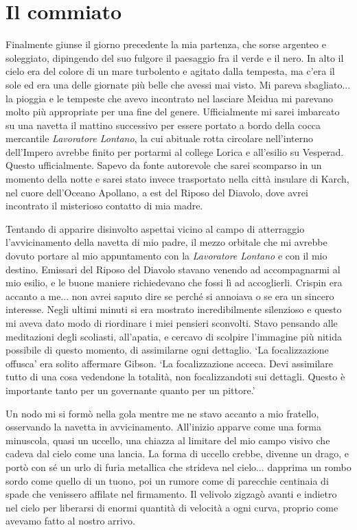 \chapter{Il commiato}

Finalmente giunse il giorno precedente la mia partenza, che sorse
argenteo e soleggiato, dipingendo del suo fulgore il paesaggio fra il
verde e il nero. In alto il cielo era del colore di un mare turbolento e
agitato dalla tempesta, ma c'era il sole ed era una delle giornate più
belle che avessi mai visto. Mi pareva sbagliato... la pioggia e le
tempeste che avevo incontrato nel lasciare Meidua mi parevano molto più
appropriate per una fine del genere. Ufficialmente mi sarei imbarcato su
una navetta il mattino successivo per essere portato a bordo della cocca
mercantile \emph{Lavoratore Lontano}, la cui abituale rotta circolare
nell'interno dell'Impero avrebbe finito per portarmi al college Lorica e
all'esilio su Vesperad. Questo ufficialmente. Sapevo da fonte autorevole
che sarei scomparso in un momento della notte e sarei stato invece
trasportato nella città insulare di Karch, nel cuore dell'Oceano
Apollano, a est del Riposo del Diavolo, dove avrei incontrato il
misterioso contatto di mia madre.

Tentando di apparire disinvolto aspettai vicino al campo di atterraggio
l'avvicinamento della navetta di mio padre, il mezzo orbitale che mi
avrebbe dovuto portare al mio appuntamento con la \emph{Lavoratore
	Lontano} e con il mio destino. Emissari del Riposo del Diavolo stavano
venendo ad accompagnarmi al mio esilio, e le buone maniere richiedevano
che fossi lì ad accoglierli. Crispin era accanto a me... non avrei
saputo dire se perché si annoiava o se era un sincero interesse. Negli
ultimi minuti si era mostrato incredibilmente silenzioso e questo mi
aveva dato modo di riordinare i miei pensieri sconvolti. Stavo pensando
alle meditazioni degli scoliasti, all'apatia, e cercavo di scolpire
l'immagine più nitida possibile di questo momento, di assimilarne ogni
dettaglio. `La focalizzazione offusca' era solito affermare Gibson. `La
focalizzazione acceca. Devi assimilare tutto di una cosa vedendone la
totalità, non focalizzandoti sui dettagli. Questo è importante tanto per
un governante quanto per un pittore.'

Un nodo mi si formò nella gola mentre me ne stavo accanto a mio
fratello, osservando la navetta in avvicinamento. All'inizio apparve
come una forma minuscola, quasi un uccello, una chiazza al limitare del
mio campo visivo che cadeva dal cielo come una lancia. La forma di
uccello crebbe, divenne un drago, e portò con sé un urlo di furia
metallica che strideva nel cielo... dapprima un rombo sordo come quello
di un tuono, poi un rumore come di parecchie centinaia di spade che
venissero affilate nel firmamento. Il velivolo zigzagò avanti e indietro
nel cielo per liberarsi di enormi quantità di velocità a ogni curva,
proprio come avevamo fatto al nostro arrivo.

